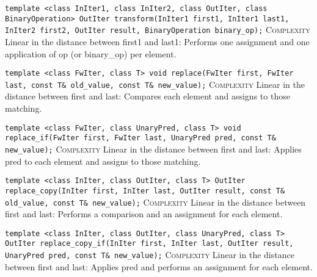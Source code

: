 \noindent{}\hspace*{0.25em}\lstinline[basicstyle=\ttfamily\color{corange}]{template <class InIter1, class InIter2, class OutIter, class BinaryOperation> OutIter transform(InIter1 first1, InIter1 last1, InIter2 first2, OutIter result, BinaryOperation binary_op);} \textsc{Complexity} Linear in the distance between first1 and last1: Performs one assignment and one application of op (or binary\_op) per element.\\\vspace{-0.6em}

\noindent{}\hspace*{0.25em}\lstinline[basicstyle=\ttfamily\color{corange}]{template <class FwIter, class T> void replace(FwIter first, FwIter last, const T& old_value, const T& new_value);} \textsc{Complexity} Linear in the distance between first and last: Compares each element and assigns to those matching.\\\vspace{-0.6em}

\noindent{}\hspace*{0.25em}\lstinline[basicstyle=\ttfamily\color{corange}]{template <class FwIter, class UnaryPred, class T> void replace_if(FwIter first, FwIter last, UnaryPred pred, const T& new_value);} \textsc{Complexity} Linear in the distance between first and last: Applies pred to each element and assigns to those matching.\\\vspace{-0.6em}

\noindent{}\hspace*{0.25em}\lstinline[basicstyle=\ttfamily\color{corange}]{template <class InIter, class OutIter, class T> OutIter replace_copy(InIter first, InIter last, OutIter result, const T& old_value, const T& new_value);} \textsc{Complexity} Linear in the distance between first and last: Performs a comparison and an assignment for each element.\\\vspace{-0.6em}

\noindent{}\hspace*{0.25em}\lstinline[basicstyle=\ttfamily\color{corange}]{template <class InIter, class OutIter, class UnaryPred, class T> OutIter replace_copy_if(InIter first, InIter last, OutIter result, UnaryPred pred, const T& new_value);} \textsc{Complexity} Linear in the distance between first and last: Applies pred and performs an assignment for each element.\\\vspace{-0.6em}

